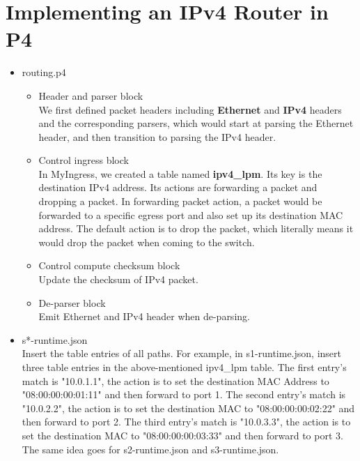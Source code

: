 \documentclass[a4paper,11pt]{article}
\begin{document}
\section{Implementing an IPv4 Router in P4}
\begin{itemize}
    \item routing.p4
    \begin{itemize}
        \item Header and parser block \\
        We first defined packet headers including \textbf{Ethernet} and \textbf{IPv4} headers and the corresponding parsers, which would start at parsing the Ethernet header, and then transition to parsing the IPv4 header.
        \item Control ingress block \\
        In MyIngress, we created a table named \textbf{ipv4\_lpm}. Its key is the destination IPv4 address. Its actions are forwarding a packet and dropping a packet.  In forwarding packet action, a packet would be forwarded to a specific egress port and also set up its destination MAC address.  The default action is to drop the packet, which literally means it would drop the packet when coming to the switch.
        \item Control compute checksum block \\
        Update the checksum of IPv4 packet.
        \item De-parser block \\
        Emit Ethernet and IPv4 header when de-parsing.
    \end{itemize}
    \item s*-runtime.json \\
    Insert the table entries of all paths.  For example, in s1-runtime.json, insert three table entries in the above-mentioned ipv4\_lpm table.  The first entry's match is "10.0.1.1", the action is to set the destination MAC Address to "08:00:00:00:01:11" and then forward to port 1.  The second entry's match is "10.0.2.2", the action is to set the destination MAC to "08:00:00:00:02:22" and then forward to port 2.  The third entry's match is "10.0.3.3", the action is to set the destination MAC to "08:00:00:00:03:33" and then forward to port 3.  The same idea goes for s2-runtime.json and s3-runtime.json.
\end{itemize} 
\end{document}
